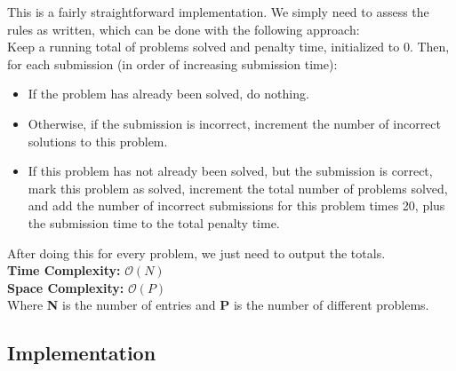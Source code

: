 This is a fairly straightforward implementation. We simply need to assess the rules as written, which can be done with the following approach:\\

Keep a running total of problems solved and penalty time, initialized to 0. Then, for each submission (in order of increasing submission time):
\begin{itemize}
	\item If the problem has already been solved, do nothing.
	\item Otherwise, if the submission is incorrect, increment the number of incorrect solutions to this problem.
	\item If this problem has not already been solved, but the submission is correct, mark this problem as solved, increment the total number of problems solved, and add the number of incorrect submissions for this problem times 20, plus the submission time to the total penalty time.
\end{itemize}
After doing this for every problem, we just need to output the totals.\\
\hfill\break
\textbf{Time Complexity:} $\mathcal{O}(N)$\\
\textbf{Space Complexity:} $\mathcal{O}(P)$\\
Where \textbf{N} is the number of entries and \textbf{P} is the number of different problems.
\subsection{Implementation}

\pagebreak
